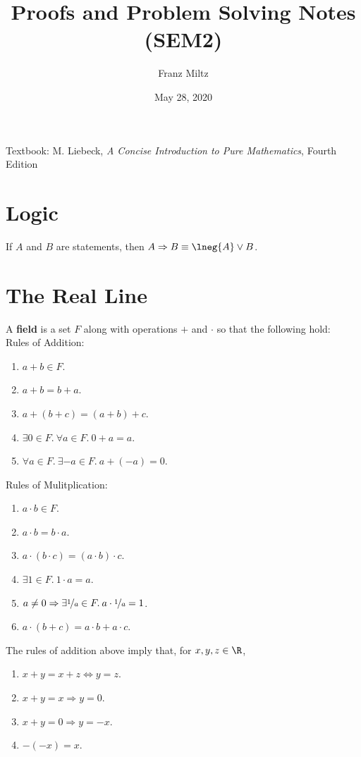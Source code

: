 \documentclass{article}
\begin{document}
\title{Proofs and Problem Solving Notes (SEM2)}
\author{Franz Miltz}
\date{May 28, 2020}
\maketitle
\noindent Textbook: M. Liebeck, \emph{A Concise Introduction to Pure Mathematics}, Fourth Edition
\mkthms
\tableofcontents
\pagebreak
\section{Logic}
\begin{theorem}
    If $A$ and $B$ are statements, then $A\Rightarrow B\equiv \lneg{A}\vee B$.
\end{theorem}
\section{The Real Line}
\begin{definition}
    A \textbf{field} is a set $F$ along with operations $+$ and $\cdot$ so that the following hold:\\
    Rules of Addition:
    \begin{enumerate}
        \item $a+b\in F$.
        \item $a+b = b+a$.
        \item $a+(b+c) = (a+b)+c$.
        \item $\exists 0\in F.\: \forall a\in F.\: 0+a=a$.
        \item $\forall a\in F.\: \exists -a\in F.\: a+(-a)=0$.
    \end{enumerate}
    Rules of Mulitplication:
    \begin{enumerate}
        \item $a\cdot b \in F$.
        \item $a\cdot b = b\cdot a$.
        \item $a\cdot(b\cdot c)=(a\cdot b)\cdot c$.
        \item $\exists 1\in F.\: 1\cdot a = a$.
        \item $a\not=0\Rightarrow\exists \nicefrac{1}{a}\in F.\: a\cdot\nicefrac{1}{a}=1$.
        \item $a\cdot (b+c) = a\cdot b + a\cdot c$.
    \end{enumerate}
\end{definition}
\begin{theorem}
    The rules of addition above imply that, for $x,y,z\in \R$,
    \begin{enumerate}
        \item $x+y=x+z\Leftrightarrow y=z$.
        \item $x+y=x\Rightarrow y=0$.
        \item $x+y=0\Rightarrow y=-x$.
        \item $-(-x)=x$.
    \end{enumerate}
\end{theorem}
\end{document}
